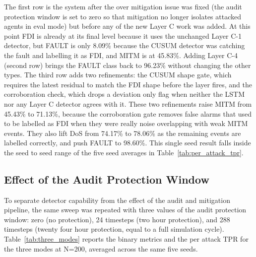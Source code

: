 \noindent
The first row is the system after the over mitigation issue was fixed (the audit protection window is set to zero so that mitigation no longer isolates attacked agents in eval mode) but before any of the new Layer C work was added. At this point FDI is already at its final level because it uses the unchanged Layer C-1 detector, but FAULT is only 8.09\% because the CUSUM detector was catching the fault and labelling it as FDI, and MITM is at 45.83\%. Adding Layer C-4 (second row) brings the FAULT class back to 96.23\% without changing the other types. The third row adds two refinements: the CUSUM shape gate, which requires the latest residual to match the FDI shape before the layer fires, and the corroboration check, which drops a deviation only flag when neither the LSTM nor any Layer C detector agrees with it. These two refinements raise MITM from 45.43\% to 71.13\%, because the corroboration gate removes false alarms that used to be labelled as FDI when they were really noise overlapping with weak MITM events. They also lift DoS from 74.17\% to 78.06\% as the remaining events are labelled correctly, and push FAULT to 98.60\%. This single seed result falls inside the seed to seed range of the five seed averages in Table~\ref{tab:per_attack_tpr}.

\par \vspace{0.35cm}

\subsection{Effect of the Audit Protection Window}

To separate detector capability from the effect of the audit and mitigation pipeline, the same sweep was repeated with three values of the audit protection window: zero (no protection), 24 timesteps (two hour protection), and 288 timesteps (twenty four hour protection, equal to a full simulation cycle). Table~\ref{tab:three_modes} reports the binary metrics and the per attack TPR for the three modes at N=200, averaged across the same five seeds.

